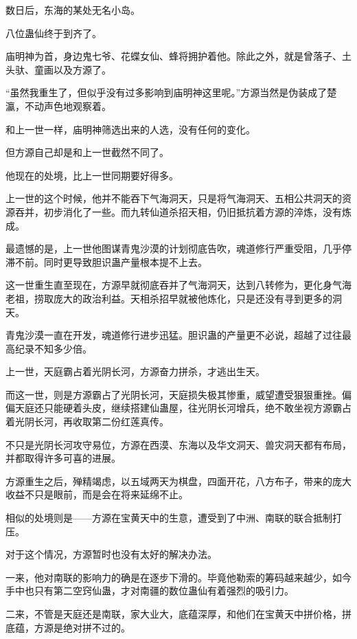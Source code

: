 
\begin{this_body}

数日后，东海的某处无名小岛。

八位蛊仙终于到齐了。

庙明神为首，身边鬼七爷、花蝶女仙、蜂将拥护着他。除此之外，就是曾落子、土头驮、童画以及方源了。

“虽然我重生了，但似乎没有过多影响到庙明神这里呢。”方源当然是伪装成了楚瀛，不动声色地观察着。

和上一世一样，庙明神筛选出来的人选，没有任何的变化。

但方源自己却是和上一世截然不同了。

他现在的处境，比上一世同期要好得多。

上一世的这个时候，他并不能吞下气海洞天，只是将气海洞天、五相公共洞天的资源吞并，初步消化了一些。而九转仙道杀招天相，仍旧抵抗着方源的淬炼，没有炼成。

最遗憾的是，上一世他图谋青鬼沙漠的计划彻底告吹，魂道修行严重受阻，几乎停滞不前。同时更导致胆识蛊产量根本提不上去。

这一世重生直至现在，方源早就彻底吞并了气海洞天，达到八转修为，更化身气海老祖，捞取庞大的政治利益。天相杀招早就被他炼化，只是还没有寻到更多的洞天。

青鬼沙漠一直在开发，魂道修行进步迅猛。胆识蛊的产量更不必说，超越了过往最高纪录不知多少倍。

上一世，天庭霸占着光阴长河，方源奋力拼杀，才逃出生天。

而这一世，则是方源霸占了光阴长河，天庭损失极其惨重，威望遭受狠狠重挫。偏偏天庭还只能硬着头皮，继续搭建仙蛊屋，往光阴长河增兵，绝不敢坐视方源霸占着光阴长河，再收取第二份红莲真传。

不只是光阴长河攻守易位，方源在西漠、东海以及华文洞天、兽灾洞天都有布局，并都取得许多可喜的进展。

方源重生之后，殚精竭虑，以五域两天为棋盘，四面开花，八方布子，带来的庞大收益不只是眼前，而是会在将来延绵不止。

相似的处境则是——方源在宝黄天中的生意，遭受到了中洲、南联的联合抵制打压。

对于这个情况，方源暂时也没有太好的解决办法。

一来，他对南联的影响力的确是在逐步下滑的。毕竟他勒索的筹码越来越少，如今手中也只有第二空窍仙蛊，才对南疆的数位蛊仙有着强烈的吸引力。

二来，不管是天庭还是南联，家大业大，底蕴深厚，和他们在宝黄天中拼价格，拼底蕴，方源是绝对拼不过的。


\end{this_body}
